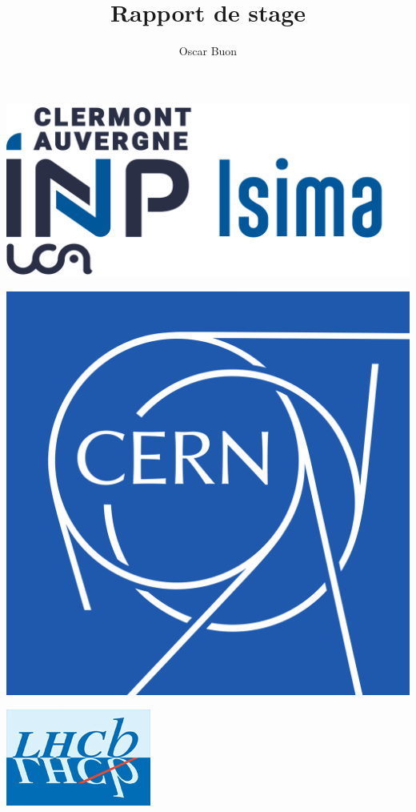 \documentclass[a4paper,11pt]{report}
\title{Rapport de stage}
\author{Oscar Buon}
\begin{document}
\begin{titlepage}
    \centering
    \begin{minipage}{0.25\textwidth}
        \includegraphics[width=\textwidth]{logo_ISIMA_INP.png}
    \end{minipage}\hfill
    \begin{minipage}{0.25\textwidth}
        \includegraphics[width=\textwidth]{logo_CERN.png}
    \end{minipage}\hfill
    \begin{minipage}{0.25\textwidth}
        \includegraphics[width=\textwidth]{logo_LHCb.png}
    \end{minipage}


\end{titlepage}
\end{document}
